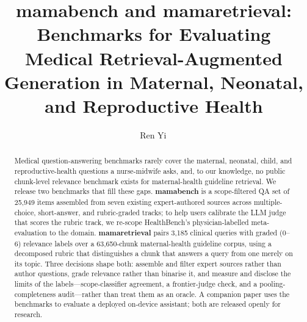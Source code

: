 \documentclass[acmsmall,nonacm]{acmart}
\title{mamabench and mamaretrieval: Benchmarks for Evaluating Medical
Retrieval-Augmented Generation in Maternal, Neonatal, and Reproductive
Health}
\author{Ren Yi\,\zhname}
\affiliation{%
  \institution{École Polytechnique Fédérale de Lausanne}
  \country{Switzerland \quad bonjour@renyi.ch}
}
\begin{document}
\begin{abstract}
Medical question-answering benchmarks rarely cover the maternal, neonatal,
child, and reproductive-health questions a nurse-midwife asks, and, to our
knowledge, no public chunk-level relevance benchmark exists for maternal-health
guideline retrieval. We release two benchmarks that fill these gaps. \textbf{mamabench} is a
scope-filtered QA set of 25{,}949 items assembled from seven existing
expert-authored sources across multiple-choice, short-answer, and rubric-graded
tracks; to help users calibrate the LLM judge that scores the rubric track, we
re-scope HealthBench's physician-labelled meta-evaluation to the domain. \textbf{mamaretrieval}
pairs 3{,}185 clinical queries with graded ($0$--$6$) relevance labels over a
63{,}650-chunk maternal-health guideline corpus, using a decomposed rubric that
distinguishes a chunk that answers a query from one merely on its topic. Three
decisions shape both: assemble and filter expert sources rather than author
questions, grade relevance rather than binarise it, and measure and disclose the
limits of the labels---scope-classifier agreement, a frontier-judge check,
and a pooling-completeness audit---rather than treat them as an oracle. A
companion paper uses the benchmarks to evaluate a deployed on-device assistant;
both are released openly for research.
\end{abstract}


\maketitle











\appendix

\end{document}
